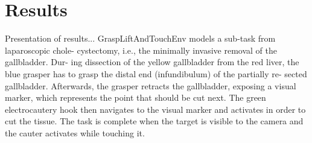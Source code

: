 
\chapter{Results}
Presentation of results...
GraspLiftAndTouchEnv models a sub-task from laparoscopic chole-
cystectomy, i.e., the minimally invasive removal of the gallbladder. Dur-
ing dissection of the yellow gallbladder from the red liver, the blue
grasper has to grasp the distal end (infundibulum) of the partially re-
sected gallbladder. Afterwards, the grasper retracts the gallbladder,
exposing a visual marker, which represents the point that should be
cut next. The green electrocautery hook then navigates to the visual
marker and activates in order to cut the tissue. The task is complete
when the target is visible to the camera and the cauter activates while
touching it.

